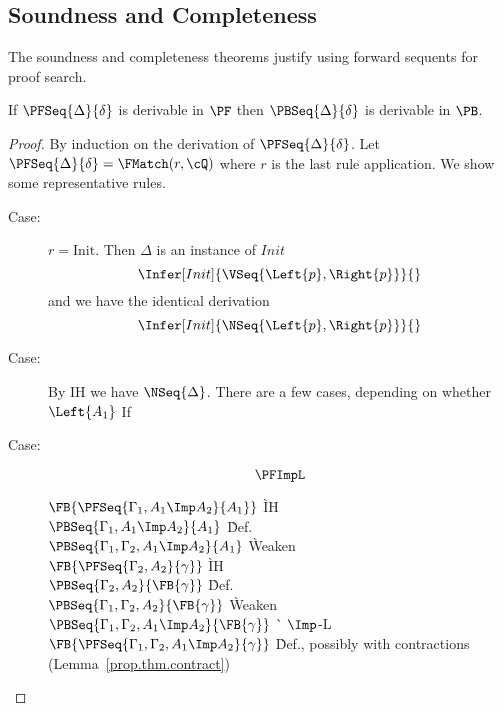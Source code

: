 \subsection{Soundness and Completeness}

The soundness and completeness theorems justify using forward sequents for proof
search.
\begin{theorem}[Soundness]
  \label{prop.thm.forward-sound}
  If $\PFSeq{\Delta}{\delta}$ is derivable in $\PF$ then
  $\PBSeq{\Delta}{\delta}$ is derivable in $\PB$.
\end{theorem}

\begin{proof}
  By induction on the derivation of $\PFSeq{\Delta}{\delta}$.
  Let $\PFSeq{\Delta}{\delta} = \FMatch(r, \cQ)$ where $r$ is the last
  rule application.  We show some representative rules.
  \begin{description}
  \item[Case:]
    $r = \mbox{Init}$.
    Then $\Delta$ is an instance of $Init$
    \[ \Infer[Init]{\VSeq{\Left{p},\Right{p}}}{} \]
    and we have the identical derivation
    \[ \Infer[Init]{\NSeq{\Left{p},\Right{p}}}{} \]
  \item[Case:]
    {}
    By IH we have $\NSeq{\Delta}$.  There are a few cases, depending
    on whether $\Left{A_1}$
    If

  \item[Case:]
    \[ \PFImpL \]
    \begin{tabbing}
      $\FB{\PFSeq{\Gamma_1, A_1\Imp A_2}{A_1}}$ \` IH \\
      $\PBSeq{\Gamma_1, A_1\Imp A_2}{A_1}$ \` Def. \\
      $\PBSeq{\Gamma_1, \Gamma_2, A_1\Imp A_2}{A_1}$ \` Weaken \\
      $\FB{\PFSeq{\Gamma_2, A_2}{\gamma}}$ \` IH \\
      $\PBSeq{\Gamma_2, A_2}{\FB{\gamma}}$ \` Def. \\
      $\PBSeq{\Gamma_1, \Gamma_2, A_2}{\FB{\gamma}}$ \` Weaken \\
      $\PBSeq{\Gamma_1, \Gamma_2, A_1\Imp A_2}{\FB{\gamma}}$ \` $\Imp$-L\\
      $\FB{\PFSeq{\Gamma_1, \Gamma_2, A_1\Imp A_2}{\gamma}}$
      \` Def., possibly with contractions (Lemma~\ref{prop.thm.contract})\\
    \end{tabbing}
  \end{description}
\end{proof}

